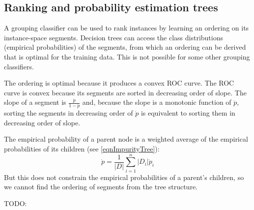 \subsection{Ranking and probability estimation trees}

A grouping classifier can be used to rank instances by learning an ordering on its instance-space segments.
Decision trees can access the class distributions (empirical probabilities) of the segments, from which an ordering can be derived that is optimal for the training data.
This is not possible for some other grouping classifiers.

The ordering is optimal because it produces a convex ROC curve.
The ROC curve is convex because its segments are sorted in decreasing order of slope.
The slope of a segment is $\frac{\dot{p}}{1 - \dot{p}}$ and, because the slope is a monotonic function of $\dot{p}$, sorting the segments in decreasing order of $\dot{p}$ is equivalent to sorting them in decreasing order of slope.

The empirical probability of a parent node is a weighted average of the empirical probabilities of its children (see \ref{eqnImpurityTree}):
\begin{equation}
  \dot{p} =  \frac{1}{|D|} \sum_{i = 1}^{n} |D_i| \dot{p}_i
\end{equation}
But this does not constrain the empirical probabilities of a parent's children, so we cannot find the ordering of segments from the tree structure.

TODO:

